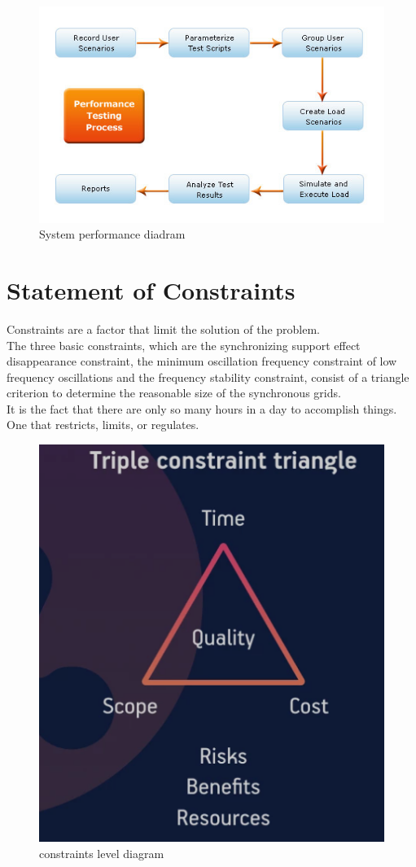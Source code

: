 \documentclass[a4paper,12pt]{book}
\begin{document}
\begin{figure}[h]
	\centering
	\includegraphics[width=0.7\linewidth]{Performance-Testing-Process}
	\caption{System performance diadram}
	\label{fig:performance-testing-process}
\end{figure}
\section{Statement of Constraints}
	Constraints are a factor that limit the solution of the problem.\\
	The three basic constraints, which are the synchronizing support effect disappearance constraint, the minimum oscillation frequency constraint of low frequency oscillations and the frequency stability constraint, consist of a triangle criterion to determine the reasonable size of the synchronous grids.\\
	It is the fact that there are only so many hours in a day to accomplish things. One that restricts, limits, or regulates.\\	
\begin{figure}[h]
	\centering
	\includegraphics[width=0.6\linewidth]{7_1}
	\caption{constraints level diagram}
	\label{fig:71}
\end{figure}
\end{document}

